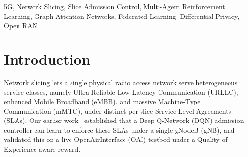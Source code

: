 \documentclass[journal]{IEEEtran}
\begin{document}
\begin{abstract}
collapses but never cleanly differentiates either, a real,
cluster-size-specific effect distinct from anything at $N=3$.
GAT-CTDE's own collapse rate initially disagreed sharply between two
seed samples (31\% vs.\ 78\%); five further independent samples drawn
specifically to resolve the discrepancy converged on 35.4\%
[25.5\%, 45.8\%] across 64 seeds, an estimate every one of the later
samples lands close to while the second sample's 78\% reads as the
outlier in hindsight. This is a caution about trusting any single small
sample, not just the ones that turn out wrong. Finally, we
anchor this paper's single-agent baseline against a real OAI testbed.
Its offline-trained differentiated-shedding decisions transfer to live
traffic unchanged (replicated across two independent runs), while its
SLA-margin metric diverges from anything offline by orders of
magnitude. This is traced, not left unexplained, to a real backlog regime
this rig's own prior live data independently corroborates, and
narrowed from six orders of magnitude to three with a physically-
grounded, latency-based recalibration. Together these
results argue that admission-control evaluation in multi-agent,
privacy-constrained, disruption-prone settings needs metrics tied to
the actual training objective, not only to a downstream SLA proxy that
can reward the wrong policy, and that architectural claims need more
than one seed sample before they are trusted.
\end{abstract}

\begin{IEEEkeywords}
5G, Network Slicing, Slice Admission Control, Multi-Agent Reinforcement Learning, Graph Attention Networks, Federated Learning, Differential Privacy, Open RAN
\end{IEEEkeywords}

\section{Introduction}
Network slicing lets a single physical radio access network serve
heterogeneous service classes, namely Ultra-Reliable Low-Latency
Communication (URLLC), enhanced Mobile Broadband (eMBB), and massive
Machine-Type Communication (mMTC), under distinct per-slice Service
Level Agreements (SLAs). Our earlier work~\cite{mecon-paper1,icraie-paper2}
established that a Deep Q-Network (DQN) admission controller can learn
to enforce these SLAs under a single gNodeB (gNB), and validated this
on a live OpenAirInterface (OAI) testbed under a Quality-of-Experience-aware
reward.
\end{document}
